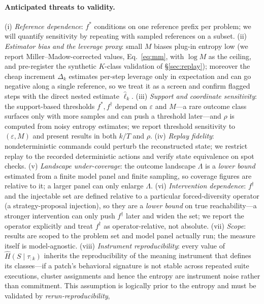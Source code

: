 \documentclass[11pt]{article}
\newcommand{\Hk}{\widehat{H}\!\left(S \mid \tau_{:k}\right)}
\begin{document}
\paragraph{Anticipated threats to validity.}
(i) \emph{Reference dependence}: $f^\ast$ conditions on one reference prefix per
problem; we will quantify sensitivity by repeating with sampled references on a
subset. (ii) \emph{Estimator bias and the leverage proxy}: small $M$ biases plug-in
entropy low (we report Miller--Madow-corrected values, Eq.~\eqref{eq:mm}, with
$\log M$ as the ceiling, and pre-register the synthetic $K$-class validation of
\S\ref{sec:replay});
moreover the cheap increment $\Delta_k$ estimates per-step leverage only in
expectation and can go negative along a single reference, so we treat it as a screen
and confirm flagged steps with the direct nested estimate $\widehat\ell_k$. (iii)
\emph{Support and coordinate sensitivity}: the support-based thresholds
$f^\ast,f^\dagger$ depend on $\varepsilon$ and $M$---a rare outcome class surfaces
only with more samples and can push a threshold later---and $\rho$ is computed from
noisy entropy estimates; we report threshold sensitivity to $(\varepsilon,M)$ and
present results in both $k/T$ and $\rho$. (iv)
\emph{Replay fidelity}: nondeterministic commands could perturb the reconstructed
state; we restrict replay to the recorded deterministic actions and verify state
equivalence on spot checks. (v) \emph{Landscape under-coverage}: the outcome
landscape $\Lambda$ is a \emph{lower bound} estimated from a finite model panel and
finite sampling, so coverage figures are relative to it; a larger panel can only
enlarge $\Lambda$. (vi) \emph{Intervention dependence}: $f^\dagger$ and the
injectable set are defined relative to a particular forced-diversity operator (a
strategy-proposal injection), so they are a \emph{lower bound} on true
reachability---a stronger intervention can only push $f^\dagger$ later and widen the
set; we report the operator explicitly and treat $f^\dagger$ as operator-relative,
not absolute. (vii) \emph{Scope}: results are scoped to the problem set and
model panel actually run; the measure itself is model-agnostic. (viii)
\emph{Instrument reproducibility}: every value of $\Hk$ inherits the reproducibility
of the meaning instrument that defines its classes---if a patch's behavioral
signature is not stable across repeated suite executions, cluster assignments and
hence the entropy are instrument noise rather than commitment. This assumption is
logically prior to the entropy and must be validated by \emph{rerun-reproducibility},
\end{document}
